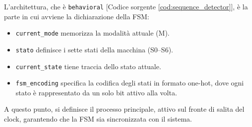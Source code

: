 L'architettura, che è \texttt{behavioral} [Codice sorgente \ref{cod:sequence_detector}], è la parte in cui avviene la dichiarazione della FSM:

\begin{itemize}
    \item \texttt{current\_mode} memorizza la modalità attuale (M).
    \item \texttt{stato} definisce i sette stati della macchina (S0--S6).
    \item \texttt{current\_state} tiene traccia dello stato attuale.
    \item \texttt{fsm\_encoding} specifica la codifica degli stati in formato one-hot, dove ogni stato è rappresentato da un solo bit attivo alla volta.
\end{itemize}

A questo punto, si definisce il processo principale, attivo sul fronte di salita del clock, garantendo che la FSM sia sincronizzata con il sistema.

